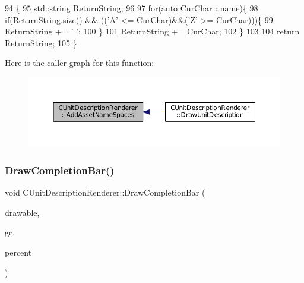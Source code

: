 \begin{DoxyCode}
94                                                                            \{
95     std::string ReturnString;
96     
97     \textcolor{keywordflow}{for}(\textcolor{keyword}{auto} CurChar : name)\{
98         \textcolor{keywordflow}{if}(ReturnString.size() && ((\textcolor{charliteral}{'A'} <= CurChar)&&(\textcolor{charliteral}{'Z'} >= CurChar)))\{
99             ReturnString += \textcolor{charliteral}{' '};   
100         \}
101         ReturnString += CurChar;
102     \}
103     
104     \textcolor{keywordflow}{return} ReturnString;
105 \}
\end{DoxyCode}
Here is the caller graph for this function\+:
\nopagebreak
\begin{figure}[H]
\begin{center}
\leavevmode
\includegraphics[width=350pt]{classCUnitDescriptionRenderer_ae18d6862ae305bd5633558f86457270b_icgraph}
\end{center}
\end{figure}
\hypertarget{classCUnitDescriptionRenderer_a1faaa0097504c0ccf2f8017449324377}{}\label{classCUnitDescriptionRenderer_a1faaa0097504c0ccf2f8017449324377} 
\subsubsection{\texorpdfstring{Draw\+Completion\+Bar()}{DrawCompletionBar()}}
{\footnotesize\ttfamily void C\+Unit\+Description\+Renderer\+::\+Draw\+Completion\+Bar (\begin{DoxyParamCaption}\item[{Gdk\+Drawable $\ast$}]{drawable,  }\item[{Gdk\+GC $\ast$}]{gc,  }\item[{int}]{percent }\end{DoxyParamCaption})\hspace{0.3cm}{\ttfamily [protected]}}



